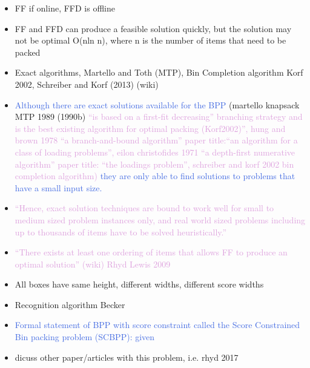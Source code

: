 \documentclass[oribibl]{llncs}
\begin{document}
\begin{itemize}
	\item FF if online, FFD is offline
	\item FF and FFD can produce a feasible solution quickly, but the solution may not be optimal O(nln n), where n is the number of items that need to be packed
	\item Exact algorithms, Martello and Toth (MTP), Bin Completion algorithm Korf 2002, Schreiber and Korf (2013) (wiki)
	\item \textcolor{RoyalBlue}{Although there are exact solutions available for the BPP} (martello knapsack MTP 1989 (1990b) \textcolor{Plum}{``is based on a first-fit decreasing'' branching strategy and is the best existing algorithm for optimal packing (Korf2002)'', hung and brown 1978 ``a branch-and-bound algorithm'' paper title:``an algorithm for a class of loading problems'', eilon christofides 1971 ``a depth-first numerative algorithm'' paper title: ``the loadings problem'', schreiber and korf 2002 bin completion algorithm)} \textcolor{RoyalBlue}{they are only able to find solutions to problems that have a small input size.}
	\item \textcolor{Plum}{``Hence, exact solution techniques are bound to work well for small to medium sized problem instances only, and real world sized problems including up to thousands of items have to be solved heuristically.''}
	\item \textcolor{Plum}{``There exists at least one ordering of items that allows FF to produce an optimal solution'' (wiki) Rhyd Lewis 2009}
	\item All boxes have same height, different widths, different score widths
	\item Recognition algorithm Becker
	\item \textcolor{RoyalBlue}{Formal statement of BPP with score constraint called the Score Constrained Bin packing problem (SCBPP): given}
	\item dicuss other paper/articles with this problem, i.e. rhyd 2017	
\end{itemize}
\end{document}
